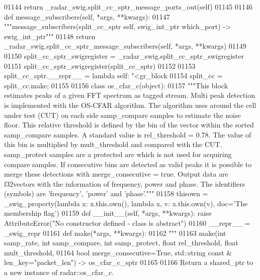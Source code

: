 \begin{DoxyCode}
{{{{{01144         \textcolor{keywordflow}{return} \_radar\_swig.split\_cc\_sptr\_message\_ports\_out(self)
01145 
01146     \textcolor{keyword}{def }message_subscribers(self, *args, **kwargs):
01147         \textcolor{stringliteral}{"""message\_subscribers(split\_cc\_sptr self, swig\_int\_ptr which\_port) -> swig\_int\_ptr"""}
01148         \textcolor{keywordflow}{return} \_radar\_swig.split\_cc\_sptr\_message\_subscribers(self, *args, **kwargs)
01149 
01150 split\_cc\_sptr\_swigregister = \_radar\_swig.split\_cc\_sptr\_swigregister
01151 split_cc_sptr_swigregister(split\_cc\_sptr)
01152 
01153 split\_cc\_sptr.\_\_repr\_\_ = \textcolor{keyword}{lambda} self: \textcolor{stringliteral}{"<gr\_block %
01154 split\_cc = split\_cc.make;
01155 
01156 \textcolor{keyword}{class }os_cfar_c(object):
01157     \textcolor{stringliteral}{"""This block estimates peaks of a given FFT spectrum as tagged stream. Multi peak detection is
       implemented with the OS-CFAR algorithm. The algorithm uses around the cell under test (CUT) on each side
       samp\_compare samples to estimate the noise floor. This relative threshold is defined by the bin of the vector within
       the sorted samp\_compare samples. A standard value is rel\_threshold = 0.78. The value of this bin is
       multiplied by mult\_threshold and compared with the CUT. samp\_protect samples are a protected are which is not used
       for acquiring compare samples. If consecutive bins are detected as valid peaks it is possible to merge these
       detections with merge\_consecutive = true. Output data are f32vectors with the information of frequency, power
       and phase. The identifiers (symbols) are 'frequency', 'power' and 'phase'."""}
01158     thisown = _swig_property(\textcolor{keyword}{lambda} x: x.this.own(), \textcolor{keyword}{lambda} x, v: x.this.own(v), doc=\textcolor{stringliteral}{'The membership flag'})
01159     \textcolor{keyword}{def }__init__(self, *args, **kwargs): \textcolor{keywordflow}{raise} AttributeError(\textcolor{stringliteral}{"No constructor defined - class is abstract"})
01160     \_\_repr\_\_ = \_swig\_repr
01161     \textcolor{keyword}{def }make(*args, **kwargs):
01162         \textcolor{stringliteral}{"""}
01163 \textcolor{stringliteral}{        make(int samp\_rate, int samp\_compare, int samp\_protect, float rel\_threshold, float mult\_threshold, }
01164 \textcolor{stringliteral}{            bool merge\_consecutive=True, std::string const & len\_key="packet\_len") -> os\_cfar\_c\_sptr}
01165 \textcolor{stringliteral}{}
01166 \textcolor{stringliteral}{        Return a shared\_ptr to a new instance of radar::os\_cfar\_c.}
}}}}}}
\end{DoxyCode}
